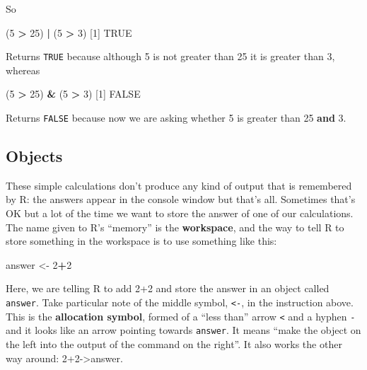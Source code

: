 \documentclass[
]{book}
\newenvironment{Shaded}{\begin{snugshade}}{\end{snugshade}}
\newcommand{\DecValTok}[1]{\textcolor[rgb]{0.00,0.00,0.81}{#1}}
\newcommand{\NormalTok}[1]{#1}
\newcommand{\OperatorTok}[1]{\textcolor[rgb]{0.81,0.36,0.00}{\textbf{#1}}}
\newcommand{\OtherTok}[1]{\textcolor[rgb]{0.56,0.35,0.01}{#1}}
\newcommand{\StringTok}[1]{\textcolor[rgb]{0.31,0.60,0.02}{#1}}
\begin{document}
So

\begin{Shaded}
\begin{Highlighting}[]

\NormalTok{(}\DecValTok{5} \OperatorTok{>}\StringTok{ }\DecValTok{25}\NormalTok{) }\OperatorTok{|}\StringTok{ }\NormalTok{(}\DecValTok{5} \OperatorTok{>}\StringTok{ }\DecValTok{3}\NormalTok{)}
\NormalTok{[}\DecValTok{1}\NormalTok{] }\OtherTok{TRUE}
\end{Highlighting}
\end{Shaded}

Returns \texttt{TRUE} because although 5 is not greater than 25 it is greater than 3, whereas

\begin{Shaded}
\begin{Highlighting}[]
\NormalTok{(}\DecValTok{5} \OperatorTok{>}\StringTok{ }\DecValTok{25}\NormalTok{) }\OperatorTok{&}\StringTok{ }\NormalTok{(}\DecValTok{5} \OperatorTok{>}\StringTok{ }\DecValTok{3}\NormalTok{)}
\NormalTok{[}\DecValTok{1}\NormalTok{] }\OtherTok{FALSE}
\end{Highlighting}
\end{Shaded}

Returns \texttt{FALSE} because now we are asking whether 5 is greater than 25 \textbf{and} 3.

\hypertarget{objects}{%
\subsection{Objects}\label{objects}}

These simple calculations don't produce any kind of output that is remembered by R: the answers appear in the console window but that's all. Sometimes that's OK but a lot of the time we want to store the answer of one of our calculations. The name given to R's ``memory'' is the \textbf{workspace}, and the way to tell R to store something in the workspace is to use something like this:

\begin{Shaded}
\begin{Highlighting}[]
\NormalTok{answer <-}\StringTok{ }\DecValTok{2}\OperatorTok{+}\DecValTok{2}
\end{Highlighting}
\end{Shaded}

Here, we are telling R to add 2+2 and store the answer in an object called \texttt{answer}. Take particular note of the middle symbol, \texttt{\textless{}-}, in the instruction above. This is the \textbf{allocation symbol}, formed of a ``less than'' arrow \texttt{\textless{}} and a hyphen \texttt{-} and it looks like an arrow pointing towards \texttt{answer}. It means ``make the object on the left into the output of the command on the right''. It also works the other way around: 2+2-\textgreater answer.
\end{document}
